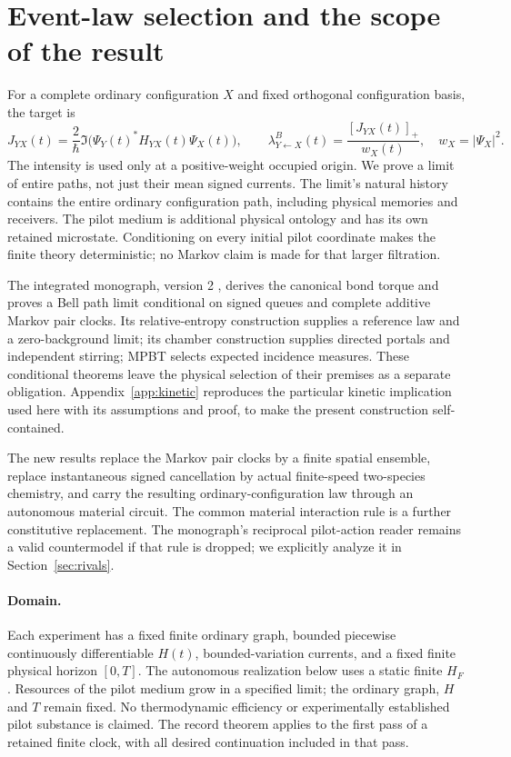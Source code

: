 \documentclass[11pt]{article}
\theoremstyle{definition}\newtheorem{definition}[theorem]{Definition}
\theoremstyle{remark}\newtheorem{remark}[theorem]{Remark}
\begin{document}
\section{Event-law selection and the scope of the result}
For a complete ordinary configuration $X$ and fixed orthogonal configuration basis, the target is
\begin{equation}
 J_{YX}(t)=\frac{2}{\hbar}\Im\bigl(\Psi_Y(t)^*H_{YX}(t)\Psi_X(t)\bigr),\qquad
 \lambda^B_{Y\leftarrow X}(t)=\frac{[J_{YX}(t)]_+}{w_X(t)},\quad w_X=|\Psi_X|^2.
 \label{eq:target}
\end{equation}
The intensity is used only at a positive-weight occupied origin. We prove a limit of entire paths, not just their mean signed currents. The limit's natural history contains the entire ordinary configuration path, including physical memories and receivers. The pilot medium is additional physical ontology and has its own retained microstate. Conditioning on every initial pilot coordinate makes the finite theory deterministic; no Markov claim is made for that larger filtration.

The integrated monograph, version 2 \cite{Monograph}, derives the canonical bond torque and proves a Bell path limit conditional on signed queues and complete additive Markov pair clocks. Its relative-entropy construction supplies a reference law and a zero-background limit; its chamber construction supplies directed portals and independent stirring; MPBT selects expected incidence measures. These conditional theorems leave the physical selection of their premises as a separate obligation. Appendix~\ref{app:kinetic} reproduces the particular kinetic implication used here with its assumptions and proof, to make the present construction self-contained.

The new results replace the Markov pair clocks by a finite spatial ensemble, replace instantaneous signed cancellation by actual finite-speed two-species chemistry, and carry the resulting ordinary-configuration law through an autonomous material circuit. The common material interaction rule is a further constitutive replacement. The monograph's reciprocal pilot-action reader remains a valid countermodel if that rule is dropped; we explicitly analyze it in Section~\ref{sec:rivals}.

\paragraph{Domain.}
Each experiment has a fixed finite ordinary graph, bounded piecewise continuously differentiable $H(t)$, bounded-variation currents, and a fixed finite physical horizon $[0,T]$. The autonomous realization below uses a static finite $H_F$. Resources of the pilot medium grow in a specified limit; the ordinary graph, $H$ and $T$ remain fixed. No thermodynamic efficiency or experimentally established pilot substance is claimed. The record theorem applies to the first pass of a retained finite clock, with all desired continuation included in that pass.
\end{document}
